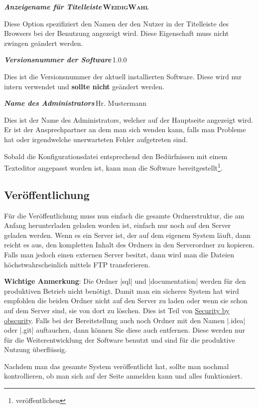 \documentclass[ngerman]{ltxdoc}
\newcommand{\DescribeOption}[4]{
  \DescribeMacro{#1}
  \begin{minipage}[t]{\textwidth}
    \textit{\textbf{\textcolor{mLightGreen}{#2}}}\dotfill\,#3\par
    \begingroup
    \vspace{0.5em}#4\par
    \endgroup
  \end{minipage}
}
\newcommand{\name}{\textbf{\textsc{WeidigWahl}}\xspace}
\begin{document}
\DescribeOption{PROJECT\_NAME}{Anzeigename für Titelleiste}{\name}{
Diese Option spezifiziert den Namen der den Nutzer in der Titelleiste des Browsers
bei der Benutzung angezeigt wird. Diese Eigenschaft muss nicht zwingen geändert
werden.
}

\DescribeOption{PROJECT\_VERSION}{Versionsnummer der Software}{1.0.0}{
Dies ist die Versionsnummer der aktuell installierten Software. Diese wird nur
intern verwendet und \textbf{sollte nicht} geändert werden.
}

\DescribeOption{ADMINISTRATOR}{Name des Administrators}{Hr. Mustermann}{
Dies ist der Name des Administrators, welcher auf der Hauptseite angezeigt wird.
Er ist der Ansprechpartner an dem man sich wenden kann, falls man Probleme hat
oder irgendwelche unerwarteten Fehler aufgetreten sind.
}

Sobald die Konfigurationsdatei entsprechend den Bedürfnissen mit einem Texteditor
angepasst worden ist, kann man die Software bereitgestellt\footnote{veröffentlichen}.

\subsection{Veröffentlichung}

Für die Veröffentlichung muss nun einfach die gesamte Ordnerstruktur, die am Anfang
herunterladen geladen worden ist, einfach nur noch auf den Server geladen werden.
Wenn es ein Server ist, der auf dem eigenem System läuft, dann reicht es aus, den
kompletten Inhalt des Ordners in den Serverordner zu kopieren. Falls man jedoch einen
externen Server besitzt, dann wird man die Dateien höchstwahrscheinlich mittels
FTP transferieren.

\textbf{Wichtige Anmerkung}: Die Ordner |sql| und |documentation| werden für den produktiven Betrieb nicht
benötigt. Damit man ein sicheres System hat wird empfohlen die beiden Ordner nicht
auf den Server zu laden oder wenn sie schon auf dem Server sind, sie von dort zu löschen.
Dies ist Teil von \href{https://de.wikipedia.org/wiki/Security_through_obscurity}{Security by obscurity}.
Falls bei der Bereitstellung auch noch Ordner mit den Namen |.idea| oder |.git| auftauchen,
dann können Sie diese auch entfernen. Diese werden nur für die Weiterentwicklung
der Software benutzt und sind für die produktive Nutzung überflüssig.

Nachdem man das gesamte System veröffentlicht hat, sollte man nochmal kontrollieren,
ob man sich auf der Seite anmelden kann und alles funktioniert.
\end{document}
